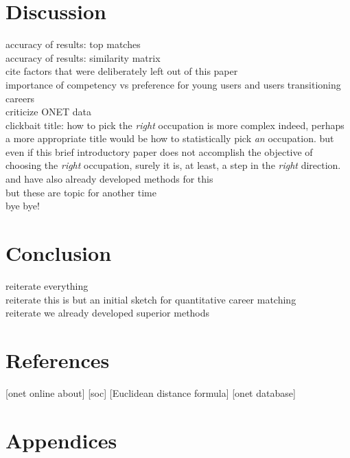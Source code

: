 \documentclass{article}
\begin{document}
\section{Discussion}
accuracy of results: top matches
\\ accuracy of results: similarity matrix
\\ cite factors that were deliberately left out of this paper
\\ importance of competency vs preference for young users and users transitioning careers
\\ criticize ONET data
\\ clickbait title: how to pick the \textit{right} occupation is more complex
indeed, perhaps a more appropriate title would be how to statistically pick \textit{an} occupation. but even if this brief introductory paper does not accomplish the objective of choosing the \textit{right} occupation, surely it is, at least, a step in the \textit{right} direction.
\\ and have also already developed methods for this
\\ but these are topic for another time
\\ bye bye!

\section{Conclusion}
reiterate everything
\\reiterate this is but an initial sketch for quantitative career matching
\\reiterate we already developed superior methods

\section{References}
[onet online about]
[soc]
[Euclidean distance formula]
[onet database]

\newpage
\section{Appendices}

    
\end{document}
